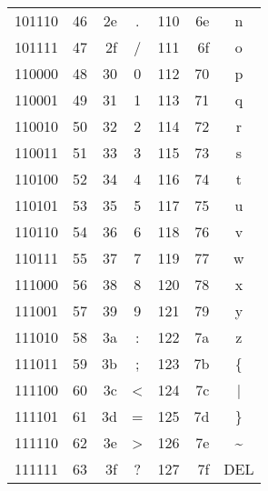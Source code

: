 \begin{tabular}[t]{CRRC|RRC}
    101110 & 46  & 2e  & .     & 110 & 6e  & n                \\
    101111 & 47  & 2f  & /     & 111 & 6f  & o                \\
    110000 & 48  & 30  & 0     & 112 & 70  & p                \\
    110001 & 49  & 31  & 1     & 113 & 71  & q                \\
    110010 & 50  & 32  & 2     & 114 & 72  & r                \\
    110011 & 51  & 33  & 3     & 115 & 73  & s                \\
    110100 & 52  & 34  & 4     & 116 & 74  & t                \\
    110101 & 53  & 35  & 5     & 117 & 75  & u                \\
    110110 & 54  & 36  & 6     & 118 & 76  & v                \\
    110111 & 55  & 37  & 7     & 119 & 77  & w                \\
    111000 & 56  & 38  & 8     & 120 & 78  & x                \\
    111001 & 57  & 39  & 9     & 121 & 79  & y                \\
    111010 & 58  & 3a  & :     & 122 & 7a  & z                \\
    111011 & 59  & 3b  & ;     & 123 & 7b  & \{               \\
    111100 & 60  & 3c  & <     & 124 & 7c  & |                \\
    111101 & 61  & 3d  & =     & 125 & 7d  & \}               \\
    111110 & 62  & 3e  & >     & 126 & 7e  & \textasciitilde  \\
    111111 & 63  & 3f  & ?     & 127 & 7f  & DEL              \\
    \bottomrule
\end{tabular}
